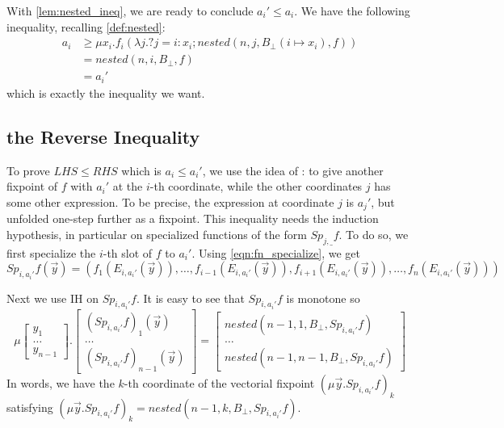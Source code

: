 With \autoref{lem:nested_ineq}, we are ready to conclude $a_i' \leq a_i$. We have the following inequality, recalling \autoref{def:nested}:
\begin{align}
    a_i &\geq \mu x_i. f_i(\lambda j. ?j=i:x_i; nested(n,j,B_\bot (i\mapsto x_i),f)) \\
    & = nested(n,i,B_\bot,f) \\
    & = a_i' \label{eqn:ai_ge_ai'}
\end{align}
which is exactly the inequality we want.

\subsection{the Reverse Inequality}
To prove $LHS \leq RHS$ which is $a_i\leq a_i'$, we use the idea of \cite{arnold2001rudiments}: to give another fixpoint of $f$ with $a_i'$ at the $i$-th coordinate, while the other coordinates $j$ has some other expression. To be precise, the expression at coordinate $j$ is $a_j'$, but unfolded one-step further as a fixpoint. This inequality needs the induction hypothesis, in particular on specialized functions of the form $Sp_{j,\_}f$. To do so, we first specialize the $i$-th slot of $f$ to $a_i'$. Using \autoref{eqn:fn_specialize}, we get
\begin{equation}
    \label{eqn:sp}
    Sp_{i,a_i'}f(\vec{y}) = (f_1(E_{i,a_i'}(\vec{y})),\dots,f_{i-1}(E_{i,a_i'}(\vec{y})),f_{i+1}(E_{i,a_i'}(\vec{y})), \dots, f_n(E_{i,a_i'}(\vec{y})))    
\end{equation}

Next we use IH on $Sp_{i,a_i'}f$. It is easy to see that $Sp_{i,a_i'}f$ is monotone so
\begin{equation}
    \label{eqn:general_Bekic_IH}
    \mu \begin{bmatrix}
    y_1 \\ \dots \\ y_{n-1}
\end{bmatrix}. \begin{bmatrix}
    (Sp_{i,a_i'}f)_1(\vec{y}) \\ \dots \\ (Sp_{i,a_i'}f)_{n-1}(\vec{y})
\end{bmatrix} = \begin{bmatrix}
    nested(n-1,1,B_\bot,Sp_{i,a_i'}f) \\ \dots \\ nested(n-1,n-1,B_\bot,Sp_{i,a_i'}f)
\end{bmatrix}
\end{equation}
In words, we have the $k$-th coordinate of the vectorial fixpoint $(\mu \vec{y}.Sp_{i,a_i'}f)_k$ satisfying $(\mu \vec{y}.Sp_{i,a_i'}f)_k = nested(n-1,k,B_\bot,Sp_{i,a_i'}f)$.

